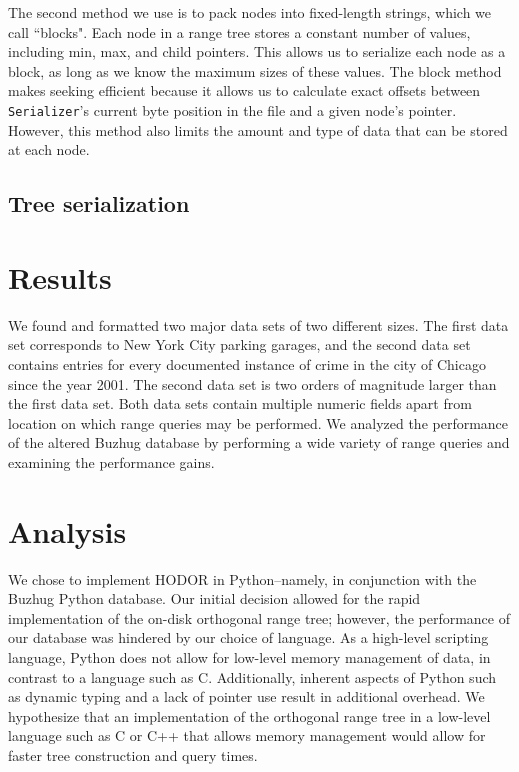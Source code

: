 \documentclass[11pt, oneside]{article}
\begin{document}
The second method we use is to pack nodes into fixed-length strings, which we
call ``blocks". Each node in a range tree stores a constant number of values,
including min, max, and child pointers. This allows us to serialize each node
as a block, as long as we know the maximum sizes of these values. The block
method makes seeking efficient because it allows us to calculate exact offsets
between \texttt{Serializer}'s current byte position in the file and a given
node's pointer. However, this method also limits the amount and type of data
that can be stored at each node. 

\subsection{Tree serialization}




\section{Results}

We found and formatted two major data sets of two different sizes. The first data set corresponds to New York City parking garages, and the second data set contains entries for every documented instance of crime in the city of Chicago since the year 2001. The second data set is two orders of magnitude larger than the first data set. Both data sets contain multiple numeric fields apart from location on which range queries may be performed. We analyzed the performance of the altered Buzhug database by performing a wide variety of range queries and examining the performance gains.


\section{Analysis}

We chose to implement HODOR in Python--namely, in conjunction with the Buzhug Python database. Our initial decision allowed for the rapid implementation of the on-disk orthogonal range tree; however, the performance of our database was hindered by our choice of language. As a high-level scripting language, Python does not allow for low-level memory management of data, in contrast to a language such as C. Additionally, inherent aspects of Python such as dynamic typing and a lack of pointer use result in additional overhead. We hypothesize that an implementation of the orthogonal range tree in a low-level language such as C or C++ that allows memory management would allow for faster tree construction and query times. 
\end{document}
